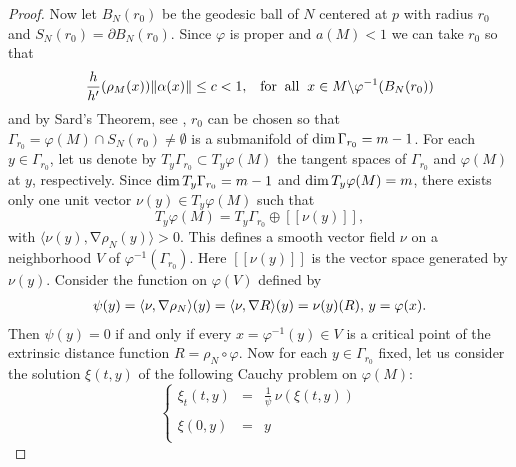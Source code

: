 \documentclass[a4paper]{amsart}
\theoremstyle{definition}
\numberwithin{equation}{section}
\begin{document}
\begin{proof}
Now let $ B_{N}(r_0)$ be the geodesic ball of $ N$ centered at $p$ with radius
$r_{0}$ and $S_{N}(r_0) =\partial B_{N}(r_0)$. Since  $\varphi$ is proper and  $a(M)<1$  we can take $r_0$ so that
\begin{equation}
\displaystyle \frac {h}{h'}(\rho_{M} (x))\Vert \alpha(x)\Vert \leq c <1,\;\;\;
{\rm for \;\; all}\;\; x \in M \backslash \varphi^{-1}(B_{N}(r_0))
\end{equation}
and by Sard's Theorem, see \cite[p.79]{DFN}, $r_{0}$ can be chosen so that
 $\Gamma_{r_0} = {\varphi(M)} { \displaystyle \cap} {S_{N}(r_0)}
\not = \emptyset $ is  a submanifold of ${\rm dim} \,\Gamma_{r_0}=
m-1$. For each $y\in \Gamma_{r_0}$, let us denote by
$T_y\Gamma_{r_0} \subset T_y\varphi(M)$ the tangent spaces of
$\Gamma_{r_0}$ and $\varphi(M)$ at $y$, respectively. Since  ${\rm dim}\, T_y\Gamma_{r_0} = m - 1$ and  ${\rm
dim}\,T_y\varphi(M)=m$, there exists only one unit vector $\nu(y) \in
T_y\varphi(M)$  such that \[ T_y\varphi(M) = T_y\Gamma_{r_0} \oplus
[[\nu(y)]], \] with $\langle \nu(y),{\operatorname{\nabla}} \!\rho_{N}(y)\rangle > 0$.
This defines a smooth vector field $\nu$ on a neighborhood $V$
of $\varphi^{-1}(\Gamma_{r_0})$. Here $[[\nu(y)]]$ is the
vector space generated by $\nu(y)$. Consider the function on
$\varphi(V)$ defined by
\begin{equation}\label{psi}
\begin{array}{ccl}
\psi(y)=\langle \nu,{\operatorname{\nabla}} \rho_{N}\rangle(y) = \langle
\nu,{\rm{\operatorname{\nabla}}}R \rangle (y)= \nu(y)(R),\,y=\varphi (x).
\end{array}
\end{equation}
Then $\psi(y) = 0$ if and only if every $x = \varphi^{-1}(y) \in V $
is a critical  point of the extrinsic distance function $R= \rho_{N} \circ \varphi$. Now for
each $y \in \Gamma_{r_0}$ fixed, let us consider the solution
$\xi(t,y) $  of the following Cauchy problem on $\varphi(M)$:
\begin{equation}\label{cauchy}
\left\{
\begin{array}{ccl}
\xi_t(t,y)&=&\displaystyle\frac{1}{\psi}\,\nu(\xi(t,y))\\
\\
\xi(0,y) &=& y\\
\end{array}
\right.
\end{equation}


\end{proof}
\end{document}
